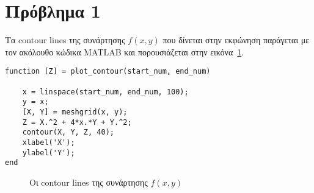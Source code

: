 \section{Πρόβλημα 1}

Τα contour lines της συνάρτησης $f(x,y)$ που δίνεται στην εκφώνηση παράγεται με τον ακόλουθο κώδικα MATLAB και πορουσιάζεται στην εικόνα~\ref{fig:prob_1_contour_lines}.

\begin{lstlisting}[]
function [Z] = plot_contour(start_num, end_num)
	
	x = linspace(start_num, end_num, 100);
	y = x;
	[X, Y] = meshgrid(x, y);
	Z = X.^2 + 4*x.*Y + Y.^2;
	contour(X, Y, Z, 40);
	xlabel('X');
	ylabel('Y');
end
\end{lstlisting}
\begin{figure}[h]
	\centering
	
	\caption{Οι contour lines της συνάρτησης $f(x,y)$}
	\label{fig:prob_1_contour_lines}
\end{figure}

